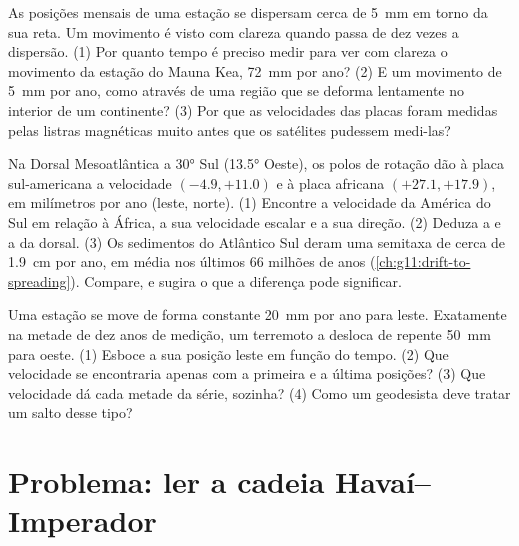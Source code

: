 \begin{exercise}[$\star\star\star$]\label{exo:g11:plate-motions:13}
As posições mensais de uma estação se dispersam cerca de \qty{5}{mm} em
torno da sua reta. Um movimento é visto com clareza quando passa de dez
vezes a dispersão. (1) Por quanto tempo é preciso medir para ver com clareza
o movimento da estação do Mauna Kea, \qty{72}{mm} por ano? (2) E um
movimento de \qty{5}{mm} por ano, como através de uma região que se deforma
lentamente no interior de um continente? (3) Por que as velocidades das
placas foram medidas pelas listras magnéticas muito antes que os satélites
pudessem medi-las?
\end{exercise}

\begin{exercise}[$\star\star\star$]\label{exo:g11:plate-motions:14}
Na Dorsal Mesoatlântica a \ang{30} Sul (\ang{13.5} Oeste), os polos de
rotação dão à placa sul-americana a velocidade $(-4.9, +11.0)$ e à placa
africana $(+27.1, +17.9)$, em milímetros por ano (leste, norte).
(1) Encontre a velocidade da América do Sul em relação à África, a sua
velocidade escalar e a sua direção. (2) Deduza a  e a
 da dorsal. (3) Os sedimentos do Atlântico Sul deram
uma semitaxa de cerca de \qty{1.9}{cm} por ano, em média nos últimos 66
milhões de anos (\cref{ch:g11:drift-to-spreading}). Compare, e sugira o que a
diferença pode significar.
\end{exercise}

\begin{exercise}[$\star\star\star$]\label{exo:g11:plate-motions:15}
Uma estação se move de forma constante \qty{20}{mm} por ano para leste.
Exatamente na metade de dez anos de medição, um terremoto a desloca de
repente \qty{50}{mm} para oeste. (1) Esboce a sua posição leste em função do
tempo. (2) Que velocidade se encontraria apenas com a primeira e a última
posições? (3) Que velocidade dá cada metade da série, sozinha? (4) Como um
geodesista deve tratar um salto desse tipo?
\end{exercise}

\section{Problema: ler a cadeia Havaí--Imperador}

